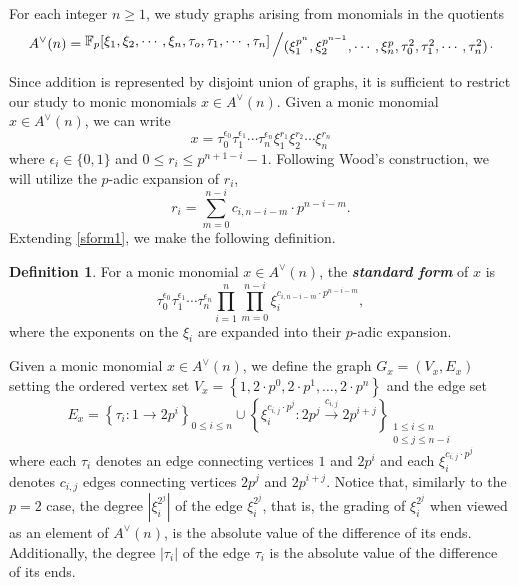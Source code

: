 \documentclass{amsart}
\theoremstyle{definition}
\newtheorem{deff}[theorem]{Definition}
\theoremstyle{plain}
\numberwithin{theorem}{section}
\numberwithin{equation}{section}
\numberwithin{figure}{section}
\newcommand{\0}{\langle 0 \rangle }
\newcommand{\bigslant}[2]{{\raisebox{.2em}{$#1$}\left/\raisebox{-.2em}{$#2$}\right.}}
\begin{document}
For each integer $n\ge1$, we study graphs arising from monomials in the quotients
$$A^\vee(n) = \bigslant{\mathbb{F}_p[\xi_1, \xi_2, \cdots, \xi_n, \tau_o, \tau_1, \cdots, \tau_n]}{(\xi_1^{p^n}, \xi_2^{p^{n-1}}, \cdots, \xi_n^{p}, \tau_0^2, \tau_1^2, \cdots, \tau_n^2)}.$$ 

Since addition is represented by disjoint union of graphs, it is sufficient to restrict our study to monic monomials $x \in A^\vee (n)$. Given a monic monomial $x \in A^\vee(n)$, we can write 
$$x = \tau_0^{\epsilon_0} \tau_1^{\epsilon_1} \cdots \tau_n^{\epsilon_n} \xi_1^{r_1} \xi_2^{r_2} \cdots \xi_{n}^{r_{n}}$$ 
where $\epsilon_i\in\{0,1\}$ and $0\le r_i\le p^{n+1-i}-1$. Following Wood's construction, we will utilize the $p$-adic expansion of $r_i$, 
$$r_i=\sum_{m=0}^{n-i}c_{i,n-i-m}\cdot p^{n-i-m}.$$
Extending \cref{sform1}, we make the following definition. 
\begin{deff}\label{def:StandardFormOdd}
    For a monic monomial $x\in A^\vee(n)$, the \textit{\textbf{standard form}} of $x$ is 
    $$\tau_0^{\epsilon_0}\tau_1^{\epsilon_1}\cdots\tau_n^{\epsilon_n}\prod_{i=1}^n\prod_{m=0}^{n-i}\xi_i^{c_{i,n-i-m}\cdot p^{n-i-m}},
    $$ where the exponents on the $\xi_i$ are expanded into their $p$-adic expansion.
\end{deff} 

Given a monic monomial $x\in A^\vee(n)$, we define the graph $G_x = (V_x, E_x)$ setting the ordered vertex set $V_x=\left\{1, 2\cdot p^0, 2\cdot p^1, \dots, 2\cdot p^n\right\}$ and the edge set
\[
E_x=\left\{\tau_i\colon 1\to 2p^i \right\}_{0\le i\le n} {\cup}\left\{\xi_i^{c_{i,j}\cdot p^j}\colon 2p^j\xrightarrow{c_{i,j}} 2p^{i + j} \right\}_{\substack{1\le i\le n \\0\le j\le n-i}}
\]
where each $\tau_i$ denotes an edge connecting vertices $1$ and $2p^i$ and each $\xi_i^{c_{i,j}\cdot p^j}$ denotes $c_{i,j}$ edges connecting vertices $2p^j$ and $2p^{i + j}$. Notice that, similarly to the $p = 2$ case,  the degree $|\xi_i^{2^j} |$ of the edge $\xi_i^{2^j}$, that is, the grading of $\xi_i^{2^j}$ when viewed as an element of $A^\vee(n)$, is the absolute value of the difference of its ends. Additionally, the degree $| \tau_i |$ of the edge $\tau_i$ is the absolute value of the difference of its ends. \color{black}
\end{document}
